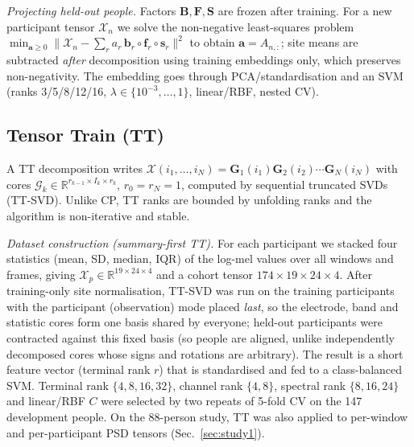 \documentclass[10pt,twocolumn,a4paper]{article}
\begin{document}
\emph{Projecting held-out people.} Factors $\mathbf B,\mathbf F,\mathbf S$ are frozen after training. For a new participant tensor $\mathcal X_n$ we solve the non-negative least-squares problem $\min_{\mathbf a\ge0}\|\mathcal X_n-\sum_r a_r\,\mathbf b_r\circ\mathbf f_r\circ\mathbf s_r\|^2$ to obtain $\mathbf a=A_{n,:}$; site means are subtracted \emph{after} decomposition using training embeddings only, which preserves non-negativity. The embedding goes through PCA/standardisation and an SVM (ranks 3/5/8/12/16, $\lambda\in\{10^{-3},\dots,1\}$, linear/RBF, nested CV).

\subsection{Tensor Train (TT)}
\label{sec:tt}
A TT decomposition \cite{oseledets2011} writes $\mathcal X(i_1,\dots,i_N)=\mathbf G_1(i_1)\mathbf G_2(i_2)\cdots\mathbf G_N(i_N)$ with cores $\mathcal G_k\in\mathbb R^{r_{k-1}\times I_k\times r_k}$, $r_0{=}r_N{=}1$, computed by sequential truncated SVDs (TT-SVD). Unlike CP, TT ranks are bounded by unfolding ranks and the algorithm is non-iterative and stable.

\emph{Dataset construction (summary-first TT).} For each participant we stacked four statistics (mean, SD, median, IQR) of the log-mel values over all windows and frames, giving $\mathcal X_p\in\mathbb R^{19\times24\times4}$ and a cohort tensor $174\times19\times24\times4$. After training-only site normalisation, TT-SVD was run on the training participants with the participant (observation) mode placed \emph{last}, so the electrode, band and statistic cores form one basis shared by everyone; held-out participants were contracted against this fixed basis (so people are aligned, unlike independently decomposed cores whose signs and rotations are arbitrary). The result is a short feature vector (terminal rank $r$) that is standardised and fed to a class-balanced SVM. Terminal rank $\{4,8,16,32\}$, channel rank $\{4,8\}$, spectral rank $\{8,16,24\}$ and linear/RBF $C$ were selected by two repeats of 5-fold CV on the 147 development people. On the 88-person study, TT was also applied to per-window and per-participant PSD tensors (Sec.~\ref{sec:study1}).
\end{document}
